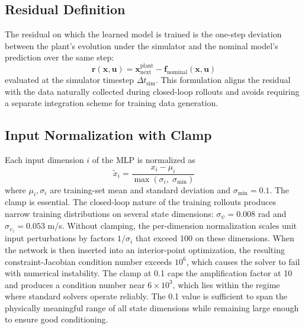 \documentclass[conference]{IEEEtran}
\begin{document}
\subsection{Residual Definition}
The residual on which the learned model is trained is the one-step deviation between the plant's evolution under the simulator and the nominal model's prediction over the same step:
\begin{equation}
\mathbf{r}(\mathbf{x}, \mathbf{u}) = \mathbf{x}^{\text{plant}}_{\text{next}} - \mathbf{f}_{\text{nominal}}(\mathbf{x}, \mathbf{u}) \tag{A.7}
\end{equation}
evaluated at the simulator timestep $\Delta t_{\text{sim}}$. This formulation aligns the residual with the data naturally collected during closed-loop rollouts and avoids requiring a separate integration scheme for training data generation.

\subsection{Input Normalization with Clamp}
Each input dimension $i$ of the MLP is normalized as
\begin{equation}
\tilde{x}_i = \frac{x_i - \mu_i}{\max(\sigma_i,\; \sigma_{\min})} \tag{A.8}
\end{equation}
where $\mu_i, \sigma_i$ are training-set mean and standard deviation and $\sigma_{\min} = 0.1$. The clamp is essential. The closed-loop nature of the training rollouts produces narrow training distributions on several state dimensions: $\sigma_{\psi} = 0.008$ rad and $\sigma_{v_z} = 0.053$ m/s. Without clamping, the per-dimension normalization scales unit input perturbations by factors $1/\sigma_i$ that exceed 100 on these dimensions. When the network is then inserted into an interior-point optimization, the resulting constraint-Jacobian condition number exceeds $10^6$, which causes the solver to fail with numerical instability. The clamp at 0.1 caps the amplification factor at 10 and produces a condition number near $6 \times 10^3$, which lies within the regime where standard solvers operate reliably. The 0.1 value is sufficient to span the physically meaningful range of all state dimensions while remaining large enough to ensure good conditioning.
\end{document}
